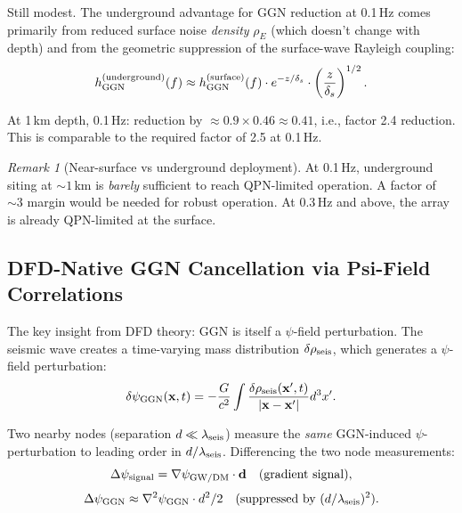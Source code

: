 \documentclass[11pt]{article}
\theoremstyle{definition}
\theoremstyle{remark}
\newtheorem{remark}[theorem]{Remark}
\begin{document}
Still modest. The underground advantage for GGN reduction at 0.1\,Hz comes
primarily from reduced surface noise \emph{density} $\rho_E$ (which doesn't
change with depth) and from the geometric suppression of the surface-wave
Rayleigh coupling:
\begin{equation}
h_{\rm GGN}^{(\rm underground)}(f) \approx h_{\rm GGN}^{(\rm surface)}(f)
\cdot e^{-z/\delta_s} \cdot \left(\frac{z}{\delta_s}\right)^{1/2}.
\end{equation}

At 1\,km depth, 0.1\,Hz: reduction by $\approx 0.9 \times 0.46 \approx 0.41$,
i.e., factor 2.4 reduction. This is comparable to the required factor of 2.5
at 0.1\,Hz.

\begin{remark}[Near-surface vs underground deployment]
At 0.1\,Hz, underground siting at $\sim 1$\,km is \emph{barely} sufficient
to reach QPN-limited operation. A factor of $\sim 3$ margin would be needed
for robust operation. At 0.3\,Hz and above, the array is already QPN-limited
at the surface.
\end{remark}

\subsection{DFD-Native GGN Cancellation via Psi-Field Correlations}

The key insight from DFD theory: GGN is itself a $\psi$-field perturbation.
The seismic wave creates a time-varying mass distribution $\delta\rho_{\rm seis}$,
which generates a $\psi$-field perturbation:
\begin{equation}
\delta\psi_{\rm GGN}(\mathbf{x}, t)
= -\frac{G}{c^2}\int \frac{\delta\rho_{\rm seis}(\mathbf{x}', t)}{|\mathbf{x}-\mathbf{x}'|}
d^3x'.
\end{equation}

Two nearby nodes (separation $d \ll \lambda_{\rm seis}$) measure the
\emph{same} GGN-induced $\psi$-perturbation to leading order in $d/\lambda_{\rm seis}$.
Differencing the two node measurements:
\begin{equation}
\Delta\psi_{\rm signal} = \nabla\psi_{\rm GW/DM} \cdot \mathbf{d}
\quad
\text{(gradient signal)},
\end{equation}
\begin{equation}
\Delta\psi_{\rm GGN} \approx \nabla^2\psi_{\rm GGN} \cdot d^2 / 2
\quad
\text{(suppressed by } (d/\lambda_{\rm seis})^2\text{)}.
\end{equation}
\end{document}
